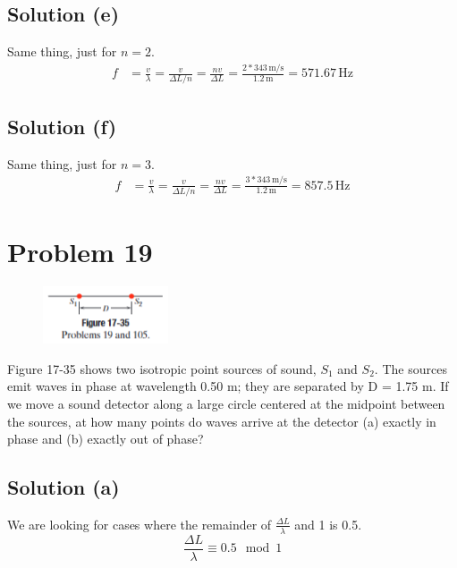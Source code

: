 \documentclass[12pt]{article}
\begin{document}
        \subsection{Solution (e)}
            Same thing, just for $n = 2$.
            \begin{align}
                f   &=  \frac{v}{\lambda}
                    =   \frac{v}{\Delta L/n}
                    =   \frac{nv}{\Delta L}
                    =   \frac{2 * 343\,\unit{\meter/\second}}{1.2\,\unit{\meter}}
                    =   \boxed{571.67\,\unit{\hertz}}
            \end{align}
        
        \subsection{Solution (f)}
            Same thing, just for $n = 3$.
            \begin{align}
                f   &=  \frac{v}{\lambda}
                    =   \frac{v}{\Delta L/n}
                    =   \frac{nv}{\Delta L}
                    =   \frac{3 * 343\,\unit{\meter/\second}}{1.2\,\unit{\meter}}
                    =   \boxed{857.5\,\unit{\hertz}}
            \end{align}

    \pagebreak
    \section{Problem 19}
        \begin{figure}
            \includegraphics[width=0.33\textwidth]{17-35.png} 
        \end{figure}
        Figure 17-35 shows two isotropic point sources of sound, $S_1$ and $S_2$. 
        The sources emit waves in phase at wavelength 0.50 m; they are separated by D = 1.75 m. 
        If we move a sound detector along a large circle centered at the midpoint between the sources, at how many points do waves arrive at the detector (a) exactly in phase and (b) exactly out of phase?

        \subsection{Solution (a)}
            We are looking for cases where the remainder of $\frac{\Delta L}{\lambda}$ and 1 is 0.5.
            \begin{equation}
                \frac{\Delta L}{\lambda} \equiv 0.5 \mod 1
            \end{equation}
\end{document}
